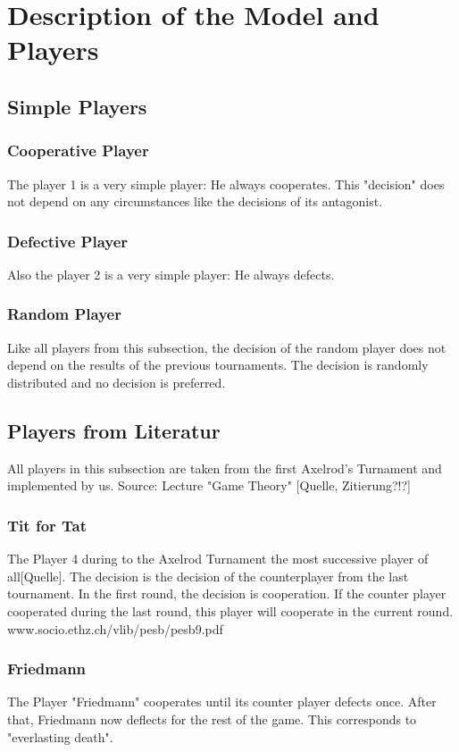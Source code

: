 \documentclass[11pt,twoside]{article}
\begin{document}
\section{Description of the Model and Players}

\subsection{Simple Players}
\subsubsection{Cooperative Player}
The player 1 is a very simple player: He always cooperates. This "decision" does not depend on any circumstances like the decisions of its antagonist. 

\subsubsection{Defective Player}
Also the player 2 is a very simple player: He always defects. 

\subsubsection{Random Player}
Like all players from this subsection, the decision of the random player does not depend on the results of the previous tournaments. The decision is randomly distributed and no decision is preferred.

\subsection{Players from Literatur}

All players in this subsection are taken from the first Axelrod's Turnament and implemented by us. Source: Lecture "Game Theory" [Quelle, Zitierung?!?]

\subsubsection{Tit for Tat}
The Player 4 during to the Axelrod Turnament the most successive player of all[Quelle]. The decision is the decision of the counterplayer from the last tournament. In the first round, the decision is cooperation. If the counter player cooperated during the last round, this player will cooperate in the current round.
www.socio.ethz.ch/vlib/pesb/pesb9.pdf

\subsubsection{Friedmann}
The Player "Friedmann" cooperates until its counter player defects once. After that, Friedmann now deflects for the rest of the game. This corresponds to "everlasting death".
\end{document}
